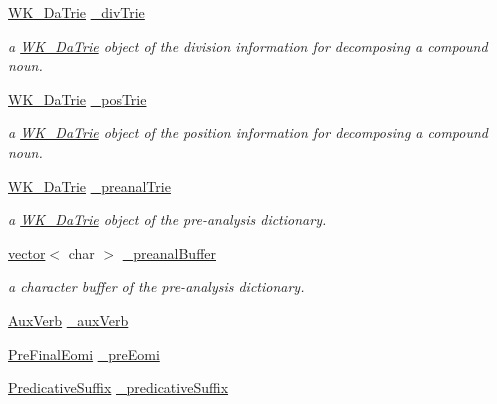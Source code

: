 \begin{CompactItemize}
\hyperlink{classkmaOrange_1_1WK__DaTrie}{WK\_\-DaTrie} \hyperlink{classkmaOrange_1_1Dictionary_44cf3309fd7c7bbefa394ac6bc78fe56}{\_\-divTrie}
\begin{CompactList}\small\item\em a \hyperlink{classkmaOrange_1_1WK__DaTrie}{WK\_\-DaTrie} object of the division information for decomposing a compound noun. \item\end{CompactList}\item 
\hyperlink{classkmaOrange_1_1WK__DaTrie}{WK\_\-DaTrie} \hyperlink{classkmaOrange_1_1Dictionary_c644dfcaa9eada0ee9a9356f8fb3db5a}{\_\-posTrie}
\begin{CompactList}\small\item\em a \hyperlink{classkmaOrange_1_1WK__DaTrie}{WK\_\-DaTrie} object of the position information for decomposing a compound noun. \item\end{CompactList}\item 
\hyperlink{classkmaOrange_1_1WK__DaTrie}{WK\_\-DaTrie} \hyperlink{classkmaOrange_1_1Dictionary_686251e5b7eb7e91319d39f166806091}{\_\-preanalTrie}
\begin{CompactList}\small\item\em a \hyperlink{classkmaOrange_1_1WK__DaTrie}{WK\_\-DaTrie} object of the pre-analysis dictionary. \item\end{CompactList}\item 
\hyperlink{classstd_1_1vector}{vector}$<$ char $>$ \hyperlink{classkmaOrange_1_1Dictionary_ed6bcde127ce4b739ab810bdd939ffca}{\_\-preanalBuffer}
\begin{CompactList}\small\item\em a character buffer of the pre-analysis dictionary. \item\end{CompactList}\item 
\hyperlink{classkmaOrange_1_1AuxVerb}{AuxVerb} \hyperlink{classkmaOrange_1_1Dictionary_7c7dd61a304ffc8fb6e66dd5eb0589da}{\_\-auxVerb}
\item 
\hyperlink{classkmaOrange_1_1PreFinalEomi}{PreFinalEomi} \hyperlink{classkmaOrange_1_1Dictionary_045a8ea9b9c9e65014bb75c9b7a37212}{\_\-preEomi}
\item 
\hyperlink{classkmaOrange_1_1PredicativeSuffix}{PredicativeSuffix} \hyperlink{classkmaOrange_1_1Dictionary_4644d581233713893af48a2536737170}{\_\-predicativeSuffix}
\end{CompactItemize}
